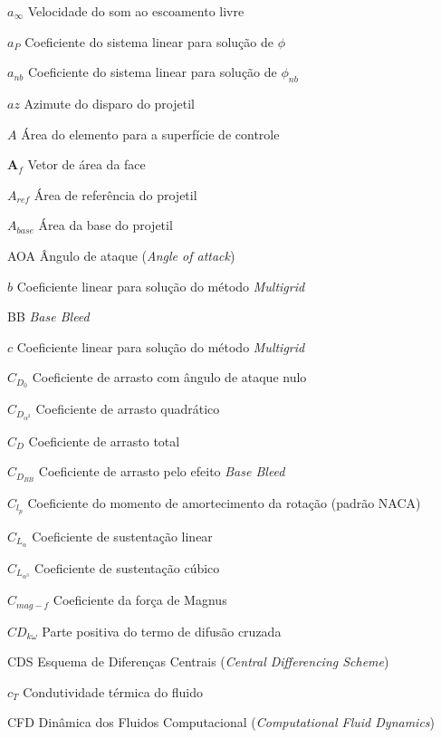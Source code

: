 \begin{siglas}
    \item[\(a_\infty\)] Velocidade do som ao escoamento livre
    \item[\(a_P\)] Coeficiente do sistema linear para solução de \(\phi\)
    \item[\(a_{nb}\)] Coeficiente do sistema linear para solução de \(\phi_{nb}\)
    \item[\(az\)] Azimute do disparo do projetil
    \item[\(A\)] Área do elemento para a superfície de controle
    \item[\(\textbf{A}_{f}\)] Vetor de área da face
    \item[\(A_{ref}\)] Área de referência do projetil
    \item[\(A_{base}\)] Área da base do projetil
    \item[AOA] Ângulo de ataque (\textit{Angle of attack})
    \item[\(b\)] Coeficiente linear para solução do método \textit{Multigrid}
    \item[BB] \textit{Base Bleed}
    \item[\(c\)] Coeficiente linear para solução do método \textit{Multigrid}
    \item[\(C_{D_0}\)] Coeficiente de arrasto com ângulo de ataque nulo
    \item[\(C_{D_{\alpha^2}}\)] Coeficiente de arrasto quadrático
    \item[\(C_{D}\)] Coeficiente de arrasto total
    \item[\(C_{D_{BB}}\)] Coeficiente de arrasto pelo efeito \textit{Base Bleed}
    \item[\(C_{l_p}\)] Coeficiente do momento de amortecimento da rotação (padrão NACA)
    \item[\(C_{L_\alpha}\)] Coeficiente de sustentação linear
    \item[\(C_{L_{\alpha^3}}\)] Coeficiente de sustentação cúbico
    \item[\(C_{mag-f}\)] Coeficiente da força de Magnus
    \item[\(CD_{k\omega}\)] Parte positiva do termo de difusão cruzada
    \item[CDS] Esquema de Diferenças Centrais (\textit{Central Differencing Scheme})
    \item[\(c_T\)] Condutividade térmica do fluido
    \item[CFD] Dinâmica dos Fluidos Computacional (\textit{Computational Fluid Dynamics})

\end{siglas}
